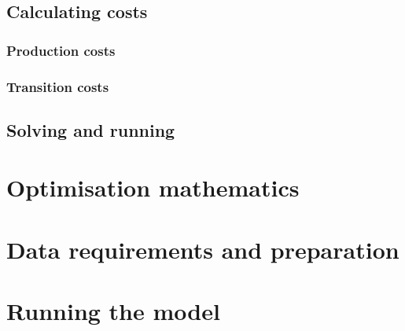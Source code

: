 \documentclass{draft}
\begin{document}

\subsection{Calculating costs}
\subsubsection{Production costs}
\subsubsection{Transition costs}

\subsection{Solving and running}\label{subsec:solvers}

\section{Optimisation mathematics}\label{sec:mathematics}

\section{Data requirements and preparation}\label{sec:dataprep}

\section{Running the model}\label{sec:running}
\end{document}
